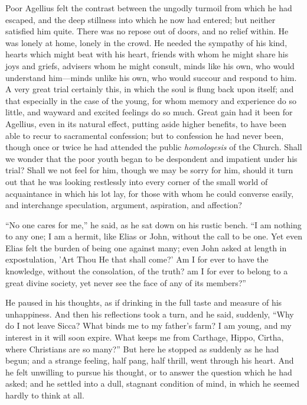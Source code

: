 Poor Agellius felt the contrast between the ungodly turmoil from
which he had escaped, and the deep stillness into which he now had
entered; but neither satisfied him quite. There was no repose out of
doors, and no relief within. He was lonely at home, lonely in the
crowd. He needed the sympathy of his kind, hearts which might beat
with his heart, friends with whom he might share his joys and griefs,
advisers whom he might consult, minds like his own, who would
understand him—minds unlike his own, who would succour and respond
to him. A very great trial certainly this, in which the soul is flung
back upon itself; and that especially in the case of the young, for
whom memory and experience do so little, and wayward and excited
feelings do so much. Great gain had it been for Agellius, even in its
natural effect, putting aside higher benefits, to have been able to
recur to sacramental confession; but to confession he had never
been, though once or twice he had attended the public \emph{homologesis}
of the Church. Shall we wonder that the poor youth began to be
despondent and impatient under his trial? Shall we not feel for him,
though we may be sorry for him, should it turn out that he was looking
restlessly into every corner of the small world of acquaintance in
which his lot lay, for those with whom he could converse easily, and
interchange speculation, argument, aspiration, and affection?

``No one cares for me,'' he said, as he sat down on his
rustic bench. ``I am nothing to any one; I am a hermit, like Elias
or John, without the call to be one. Yet even Elias felt the burden of
being one against many; even John asked at length in expostulation,
'Art Thou He that shall come?' Am I for ever to have the knowledge,
without the consolation, of the truth? am I for ever to belong to a
great divine society, yet never see the face of any of its
members?''

He paused in his thoughts, as if drinking in the full taste and
measure of his unhappiness. And then his reflections took a turn, and
he said, suddenly, ``Why do I not leave Sicca? What binds me to my
father's farm? I am young, and my interest in it will soon expire.
What keeps me from Carthage, Hippo, Cirtha, where Christians are so
many?'' But here he stopped as suddenly as he had begun; and a
strange feeling, half pang, half thrill, went through his heart. And
he felt unwilling to pursue his thought, or to answer the question
which he had asked; and he settled into a dull, stagnant
condition of mind, in which he seemed hardly to think at all.

